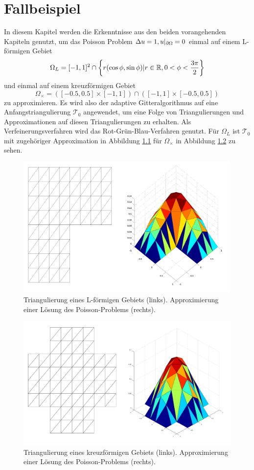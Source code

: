 \chapter{Fallbeispiel}
In diesem Kapitel werden die Erkenntnisse aus den beiden vorangehenden Kapiteln genutzt, um das Poisson Problem $\Delta u = 1, u|_{\partial \Omega} = 0$ einmal auf einem L-förmigen Gebiet   
\[
\Omega_L = [-1,1]^2 \cap \left\{ r(\cos\phi,\sin\phi)| r\in\mathbb{R},0<\phi<\frac{3 \pi}{2} \right\}
\]
und einmal auf einem kreuzförmigen Gebiet
\[
\Omega_\times = ([-0.5,0.5] \times [-1,1]) \cap ([-1,1]\times[-0.5,0.5])
\]
zu approximieren. Es wird also der adaptive Gitteralgorithmus auf eine Anfangstriangulierung $\mathscr{T}_0$ angewendet, um eine Folge von Triangulierungen und Approximationen auf diesen Triangulierungen zu erhalten. Als Verfeinerungsverfahren wird das Rot-Grün-Blau-Verfahren genutzt. Für $\Omega_L$ ist $\mathscr{T}_0$ mit zugehöriger Approximation in Abbildung \ref{grid} für $\Omega_\times$ in Abbildung \ref{grid2} zu sehen.
\begin{figure}[!htbp]
	\begin{center}
		\includegraphics[width=11.2cm]{pics/nonref.png}
	\end{center}
	\caption{\label{grid}Triangulierung eines L-förmigen Gebiets (links). Approximierung einer Lösung des Poisson-Problems (rechts).}
\end{figure}
\begin{figure}[!htbp]
	\begin{center}
		\includegraphics[width=13cm]{pics/nonref2.png}
	\end{center}
	\caption{\label{grid2}Triangulierung eines kreuzförmigen Gebiets (links). Approximierung einer Lösung des Poisson-Problems (rechts).}
\end{figure}
